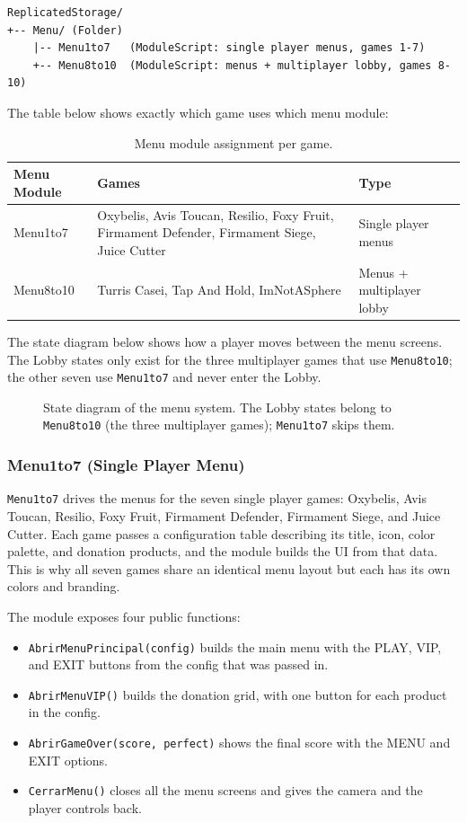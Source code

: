 \documentclass[12pt,letterpaper]{article}
\begin{document}
\begin{lstlisting}
ReplicatedStorage/
+-- Menu/ (Folder)
    |-- Menu1to7   (ModuleScript: single player menus, games 1-7)
    +-- Menu8to10  (ModuleScript: menus + multiplayer lobby, games 8-10)
\end{lstlisting}

The table below shows exactly which game uses which menu module:

\begin{table}[H]
\centering
\begin{tabular}{|p{3.5cm}|p{6.5cm}|p{4cm}|}
\hline
\textbf{Menu Module} & \textbf{Games} & \textbf{Type} \\
\hline
Menu1to7 & Oxybelis, Avis Toucan, Resilio, Foxy Fruit, Firmament Defender, Firmament Siege, Juice Cutter & Single player menus \\
\hline
Menu8to10 & Turris Casei, Tap And Hold, ImNotASphere & Menus + multiplayer lobby \\
\hline
\end{tabular}
\caption{Menu module assignment per game.}
\end{table}

The state diagram below shows how a player moves between the menu screens. The Lobby states only exist for the three multiplayer games that use \texttt{Menu8to10}; the other seven use \texttt{Menu1to7} and never enter the Lobby.

\begin{figure}[H]
  \centering
  
  \caption{State diagram of the menu system. The Lobby states belong to \texttt{Menu8to10} (the three multiplayer games); \texttt{Menu1to7} skips them.}
  \label{fig:menu_states}
\end{figure}

\subsubsection{Menu1to7 (Single Player Menu)}

\texttt{Menu1to7} drives the menus for the seven single player games: Oxybelis, Avis Toucan, Resilio, Foxy Fruit, Firmament Defender, Firmament Siege, and Juice Cutter. Each game passes a configuration table describing its title, icon, color palette, and donation products, and the module builds the UI from that data. This is why all seven games share an identical menu layout but each has its own colors and branding.

The module exposes four public functions:
\begin{itemize}
  \item \texttt{AbrirMenuPrincipal(config)} builds the main menu with the PLAY, VIP, and EXIT buttons from the config that was passed in.
  \item \texttt{AbrirMenuVIP()} builds the donation grid, with one button for each product in the config.
  \item \texttt{AbrirGameOver(score, perfect)} shows the final score with the MENU and EXIT options.
  \item \texttt{CerrarMenu()} closes all the menu screens and gives the camera and the player controls back.
\end{itemize}
\end{document}
